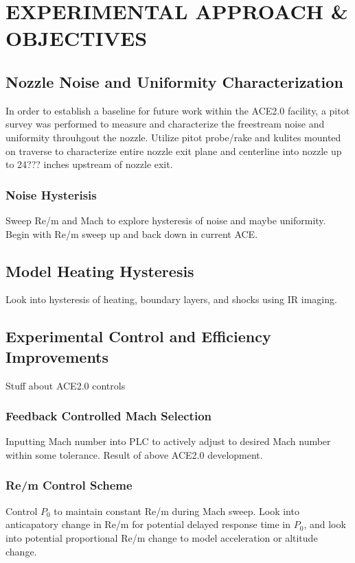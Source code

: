 %
%  
%

\chapter{EXPERIMENTAL APPROACH \& OBJECTIVES}

\section{Nozzle Noise and Uniformity Characterization}

In order to establish a baseline for future work within the ACE2.0 facility, a pitot survey was performed to measure and characterize the freestream noise and uniformity throuhgout the nozzle. Utilize pitot probe/rake and kulites mounted on traverse to characterize entire nozzle exit plane and centerline into nozzle up to 24??? inches upstream of nozzle exit.

\subsection{Noise Hysterisis}

Sweep Re/m and Mach to explore hysteresis of noise and maybe uniformity. Begin with Re/m sweep up and back down in current ACE.

\section{Model Heating Hysteresis}

Look into hysteresis of heating, boundary layers, and shocks using IR imaging. 

\section{Experimental Control and Efficiency Improvements} 

Stuff about ACE2.0 controls

\subsection{Feedback Controlled Mach Selection}

Inputting Mach number into PLC to actively adjust to desired Mach number within some tolerance. Result of above ACE2.0 development.

\subsection{Re/m Control Scheme}

Control $P_{0}$ to maintain constant Re/m during Mach sweep. Look into anticapatory change in Re/m for potential delayed response time in $P_{0}$, and look into potential proportional Re/m change to model acceleration or altitude change.

